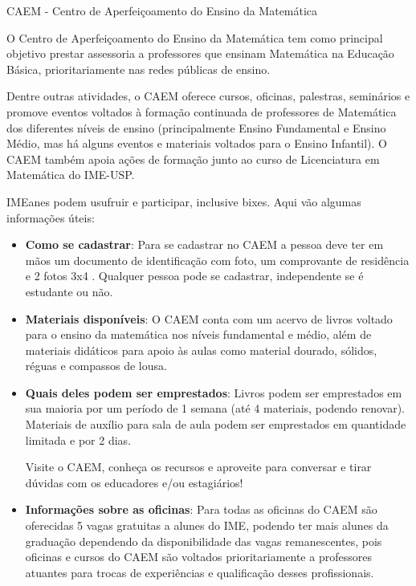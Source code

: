 \begin{secao}{CAEM - Centro de Aperfeiçoamento do Ensino da Matemática}

O Centro de Aperfeiçoamento do Ensino da Matemática tem como principal
objetivo prestar assessoria a professores que ensinam Matemática na
Educação Básica, prioritariamente nas redes públicas de ensino.

Dentre outras atividades, o CAEM oferece cursos, oficinas, palestras,
seminários e promove eventos voltados à formação continuada de
professores de Matemática dos diferentes níveis de ensino (principalmente
Ensino Fundamental e Ensino Médio, mas há alguns eventos e materiais
voltados para o Ensino Infantil). O CAEM também apoia ações de formação
junto ao curso de Licenciatura em Matemática do IME-USP.

IMEanes podem usufruir e participar, inclusive bixes. Aqui vão algumas
informações úteis:

\begin{itemize}

\item \textbf{Como se cadastrar}: Para se cadastrar no CAEM a pessoa
deve ter em mãos um documento de identificação com foto, um comprovante
de residência e 2 fotos 3x4 . Qualquer pessoa pode se cadastrar,
independente se é estudante ou não.

\item \textbf{Materiais disponíveis}: O CAEM conta com um acervo de
livros voltado para o ensino da matemática nos níveis fundamental e
médio, além de materiais didáticos para apoio às aulas como material
dourado, sólidos, réguas e compassos de lousa.

\item \textbf{Quais deles podem ser emprestados}: Livros podem ser
emprestados em sua maioria por um período de 1 semana (até 4 materiais,
podendo renovar). Materiais de auxílio para sala de aula podem ser
emprestados em quantidade limitada e por 2 dias.

  Visite o CAEM, conheça os recursos e aproveite para conversar e
  tirar dúvidas com os educadores e/ou estagiários!    

\item \textbf{Informações sobre as oficinas}: Para todas as oficinas do 
CAEM são oferecidas 5 vagas gratuitas a alunes do IME, podendo ter mais
alunes da graduação dependendo da disponibilidade das vagas remanescentes,
pois oficinas e cursos do CAEM são voltados prioritariamente a professores
atuantes para trocas de experiências e qualificação desses profissionais.


\end{itemize}
\end{secao}
